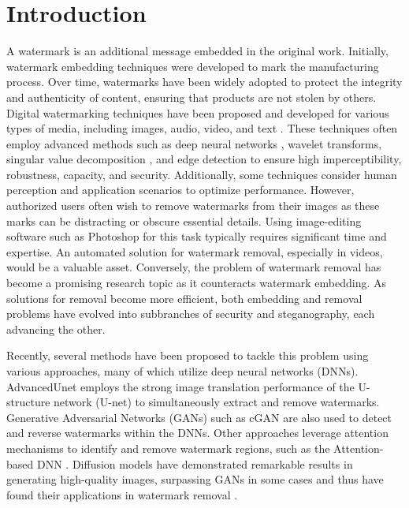 \chapter{Introduction}
\label{chapter:intro}
A watermark is an additional message embedded in the original work. Initially, watermark embedding techniques were developed to mark the manufacturing process. Over time, watermarks have been widely adopted to protect the integrity and authenticity of content, ensuring that products are not stolen by others. Digital watermarking techniques have been proposed and developed for various types of media, including images, audio, video, and text \cite{cox2007digital}. These techniques often employ advanced methods such as deep neural networks \cite{luo2023dvmark}, wavelet transforms, singular value decomposition \cite{ernawan2020block}, and edge detection \cite{kadian2021robust} to ensure high imperceptibility, robustness, capacity, and security. Additionally, some techniques consider human perception and application scenarios to optimize performance. However, authorized users often wish to remove watermarks from their images as these marks can be distracting or obscure essential details. Using image-editing software such as Photoshop for this task typically requires significant time and expertise. An automated solution for watermark removal, especially in videos, would be a valuable asset. Conversely, the problem of watermark removal has become a promising research topic as it counteracts watermark embedding. As solutions for removal become more efficient, both embedding and removal problems have evolved into subbranches of security and steganography, each advancing the other. 

Recently, several methods have been proposed to tackle this problem using various approaches, many of which utilize deep neural networks (DNNs). AdvancedUnet \cite{wei2023visual} employs the strong image translation performance of the U-structure network (U-net) to simultaneously extract and remove watermarks. Generative Adversarial Networks (GANs) such as cGAN \cite{liu2021wdnet, sun2021detect} are also used to detect and reverse watermarks within the DNNs. Other approaches leverage attention mechanisms to identify and remove watermark regions, such as the Attention-based DNN \cite{zhang2021blind}. Diffusion models have demonstrated remarkable results in generating high-quality images, surpassing GANs in some cases \cite{dhariwal2021diffusion} and thus have found their applications in watermark removal \cite{li2023diffwa}.


